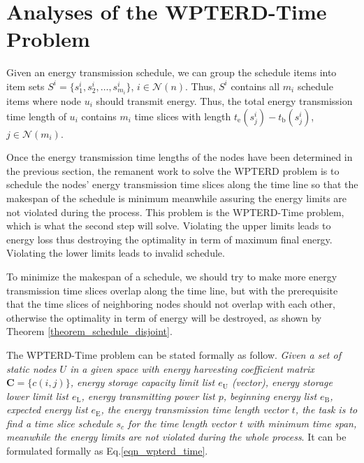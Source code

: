 \documentclass[journal,10pt]{IEEEtran}
\begin{document}
\section{Analyses of the WPTERD-Time Problem}
\label{sec_wpter_time}
Given an energy transmission schedule, we can group the schedule items into item sets $S^{i}{=}\{s^{i}_1, s^{i}_2, \ldots, s^{i}_{m_i}\}$, $i{\in}\mathcal{N}(n)$. Thus, $S^{i}$ contains all $m_i$ schedule items where node $u_i$ should transmit energy. Thus, the total energy transmission time length of $u_i$ contains $m_i$ time slices with length $t_\text{e}(s^{i}_j){-}t_\text{b}(s^{i}_j)$, $j{\in}\mathcal{N}(m_i)$.

Once the energy transmission time lengths of the nodes have been determined in the previous section, the remanent work to solve the WPTERD problem is to schedule the nodes' energy transmission time slices along the time line so that the makespan of the schedule is minimum meanwhile assuring the energy limits are not violated during the process. This problem is the WPTERD-Time problem, which is what the second step will solve. Violating the upper limits leads to energy loss thus destroying the optimality in term of maximum final energy. Violating the lower limits leads to invalid schedule.

To minimize the makespan of a schedule, we should try to make more energy transmission time slices overlap along the time line, but with the prerequisite that the time slices of neighboring nodes should not overlap with each other, otherwise the optimality in term of energy will be destroyed, as shown by Theorem \ref{theorem_schedule_disjoint}.

The WPTERD-Time problem can be stated formally as follow. \textit{Given a set of static nodes $U$ in a given space with energy harvesting coefficient matrix $\mathbf{C}{=}\{c(i,j)\}$, energy storage capacity limit list $e_\text{U}$ (vector), energy storage lower limit list $e_\text{L}$, energy transmitting power list $p$, beginning energy list $e_\text{B}$, expected energy list $e_\text{E}$, the energy transmission time length vector $t$, the task is to find a time slice schedule $s_c$ for the time length vector $t$ with minimum time span, meanwhile the energy limits are not violated during the whole process}. It can be formulated formally as Eq.\eqref{eqn_wpterd_time}.
\end{document}
